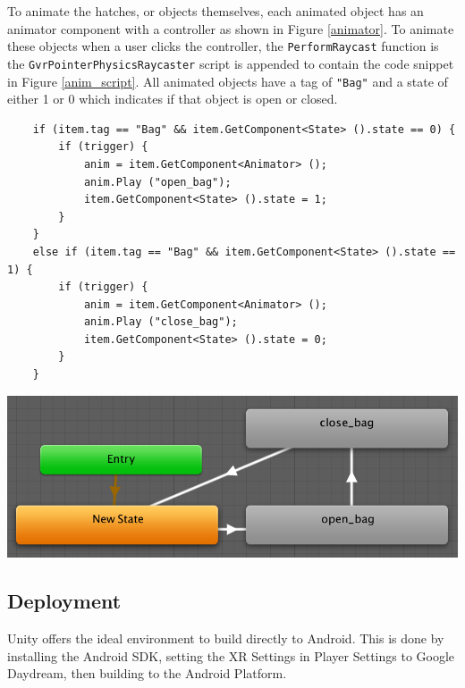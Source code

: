 \documentclass[a4paper, openright, twoside]{book}
\begin{document}
To animate the hatches, or objects themselves, each animated object has an animator component with a controller as shown in Figure \ref{animator}. To animate these objects when a user clicks the controller, the \lstinline{PerformRaycast} function is the \lstinline{GvrPointerPhysicsRaycaster} script is appended to contain the code snippet in Figure \ref{anim_script}. All animated objects have a tag of \lstinline{"Bag"} and a state of either 1 or 0 which indicates if that object is open or closed. 

\begin{center}
    \centering
    \begin{minipage}{0.6\textwidth}
    \begin{lstlisting}
	if (item.tag == "Bag" && item.GetComponent<State> ().state == 0) {
		if (trigger) {
			anim = item.GetComponent<Animator> ();
			anim.Play ("open_bag");
			item.GetComponent<State> ().state = 1;
		}
	}	
	else if (item.tag == "Bag" && item.GetComponent<State> ().state == 1) {
		if (trigger) {
			anim = item.GetComponent<Animator> ();
			anim.Play ("close_bag");
			item.GetComponent<State> ().state = 0;
		} 
	}

    \end{lstlisting}
    \label{anim_script}
    \end{minipage}\hfill
    \begin{minipage}{0.35\textwidth}
        \centering
        \includegraphics[width=1\textwidth]{images/animator.png}
        \label{animator}
    \end{minipage}
\end{center}

\subsection{Deployment}
Unity offers the ideal environment to build directly to Android. This is done by installing the Android SDK, setting the XR Settings in Player Settings to Google Daydream, then building to the Android Platform. 
\end{document}
